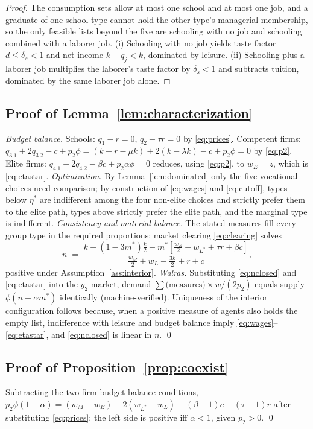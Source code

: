 \documentclass[12pt,letterpaper]{article}
\theoremstyle{definition}
\begin{document}
\begin{proof}
The consumption sets allow at most one school and at most one job, and a graduate of one school type cannot hold the other type's managerial membership, so the only feasible lists beyond the five are schooling with no job and schooling combined with a laborer job.
(i) Schooling with no job yields taste factor $d\leq\delta_s<1$ and net income $k-q_j<k$, dominated by leisure.
(ii) Schooling plus a laborer job multiplies the laborer's taste factor by $\delta_s<1$ and subtracts tuition, dominated by the same laborer job alone.
\end{proof}

\subsection{Proof of Lemma~\ref{lem:characterization}}
\emph{Budget balance.}
Schools: $q_1-r=0$, $q_2-\tau r=0$ by \eqref{eq:prices}.
Competent firms: $q_{3.1}+2q_{3.2} - c + p_2\phi = (k-r-\mu k) + 2(k-\lambda k) - c + p_2\phi = 0$ by \eqref{eq:p2}.
Elite firms: $q_{4.1}+2q_{4.2} - \beta c + p_2\alpha\phi = 0$ reduces, using \eqref{eq:p2}, to $w_E = z$, which is \eqref{eq:etastar}.
\emph{Optimization.}
By Lemma~\ref{lem:dominated} only the five vocational choices need comparison; by construction of \eqref{eq:wages} and \eqref{eq:cutoff}, types below $\eta^\ast$ are indifferent among the four non-elite choices and strictly prefer them to the elite path, types above strictly prefer the elite path, and the marginal type is indifferent.
\emph{Consistency and material balance.}
The stated measures fill every group type in the required proportions; market clearing \eqref{eq:clearing} solves
\begin{equation}\label{eq:nclosed}
  n \;=\; \frac{k - (1-3m^\ast)\frac{k}{2} - m^\ast\left[\frac{w_E}{2} +
  w_{L^\ast} + \tau r + \beta c\right]}
  {\frac{w_M}{2} + w_L - \frac{3k}{2} + r + c},
\end{equation}
positive under Assumption~\ref{ass:interior}.
\emph{Walras.}
Substituting \eqref{eq:nclosed} and \eqref{eq:etastar} into the $y_2$ market, demand $\sum \text{(measures)}\times w/(2p_2)$ equals supply $\phi(n+\alpha m^\ast)$ identically (machine-verified).
Uniqueness of the interior configuration follows because, when a positive measure of agents also holds the empty list, indifference with leisure and budget balance imply \eqref{eq:wages}--\eqref{eq:etastar}, and \eqref{eq:nclosed} is linear in $n$.
\qed

\subsection{Proof of Proposition~\ref{prop:coexist}} Subtracting the two firm budget-balance conditions, $p_2\phi(1-\alpha) = (w_M - w_E) - 2(w_{L^\ast}-w_L) - (\beta-1)c - (\tau-1)r$ after substituting \eqref{eq:prices}; the left side is positive iff $\alpha<1$, given $p_2>0$.
\qed
\end{document}

